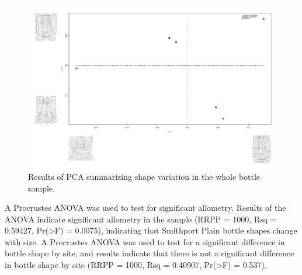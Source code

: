\documentclass[article]{sa}
\begin{document}
\begin{figure}[ht]\centering
\includegraphics[width=\linewidth]{Figure_06}
\caption{Results of PCA summarizing shape variation in the whole bottle sample.}
\label{fig:fig6}
\end{figure}

A Procrustes ANOVA was used to test for significant allometry. Results of the ANOVA indicate significant allometry in the sample (RRPP = 1000, Rsq = 0.59427, Pr(>F) = 0.0075), indicating that Smithport Plain bottle shapes change with size. A Procrustes ANOVA was used to test for a significant difference in bottle shape by site, and results indicate that there is not a significant difference in bottle shape by site (RRPP = 1000, Rsq = 0.40907, Pr(>F) = 0.537).



\end{document}
